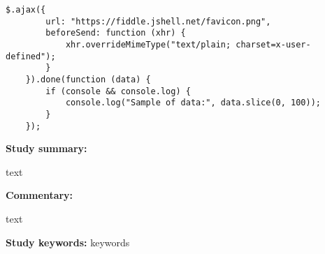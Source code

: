 \begin{lstlisting}[caption={\textit{AJAX request example \cite{API.jQuery2022}}}, label={fig:ch2_ajaxBeforesend}]  
	$.ajax({
		url: "https://fiddle.jshell.net/favicon.png",
		beforeSend: function (xhr) {
			xhr.overrideMimeType("text/plain; charset=x-user-defined");
		}
	}).done(function (data) {
		if (console && console.log) {
			console.log("Sample of data:", data.slice(0, 100));
		}
	});
\end{lstlisting}

\begin{tcolorbox}[colback=gray!5!white, colframe=deepblue!80!black, title=Test\cite{Ogheneovo2014}]
	\begin{minipage}[t]{0.25\textwidth}
		\textbf{Study summary:}
	\end{minipage}
	\hfill
	\begin{minipage}[t]{0.65\textwidth}
		text
	\end{minipage}

	\vspace{0.75em} 

	\begin{minipage}[t]{0.25\textwidth}
		\textbf{Commentary:}
	\end{minipage}
	\hfill
	\begin{minipage}[t]{0.65\textwidth}
		text
	\end{minipage}
	\tcblower
	\textbf{Study keywords:} keywords
\end{tcolorbox}


